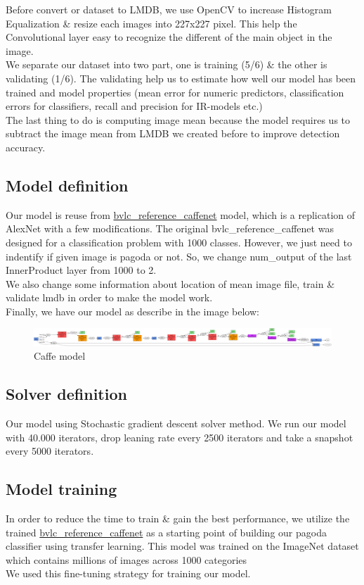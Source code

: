 Before convert or dataset to LMDB, we use OpenCV to increase Histogram Equalization \& resize each images into 227x227 pixel. This help the Convolutional layer easy to recognize the different of the main object in the image.\\

We separate our dataset into two part, one is training (5/6) \& the other is validating (1/6). The validating help us to estimate how well our model has been trained and model properties (mean error for numeric predictors, classification errors for classifiers, recall and precision for IR-models etc.)\\

The last thing to do is computing image mean because the model requires us to subtract the image mean from LMDB we created before to improve detection accuracy.
\subsection{Model definition}
Our model is reuse from \href{https://github.com/BVLC/caffe/tree/master/models/bvlc\_reference\_caffenet}{bvlc\_reference\_caffenet} model, which is a replication of AlexNet with a few modifications.
The original bvlc\_reference\_caffenet was designed for a classification problem with 1000 classes. However, we just need to indentify if given image is pagoda or not. So, we change num\_output of the last InnerProduct layer from 1000 to 2.\\
We also change some information about location of mean image file, train \& validate lmdb in order to make the model work.\\
Finally, we have our model as describe in the image below:

\begin{figure}[H]
\centering
\includegraphics[width=\textwidth]{images/caffe_model.png}
\caption{Caffe model}
\end{figure}
\subsection{Solver definition}
Our model using Stochastic gradient descent solver method.
We run our model with 40.000 iterators, drop leaning rate every 2500 iterators and take a snapshot every 5000 iterators.
\subsection{Model training}
In order to reduce the time to train \& gain the best performance, we utilize the trained \href{https://github.com/BVLC/caffe/tree/master/models/bvlc\_reference\_caffenet}{bvlc\_reference\_caffenet} as a starting point of building our pagoda classifier using transfer learning. This model was trained on the ImageNet dataset which contains millions of images across 1000 categories\\
We used this fine-tuning strategy for training our model.
